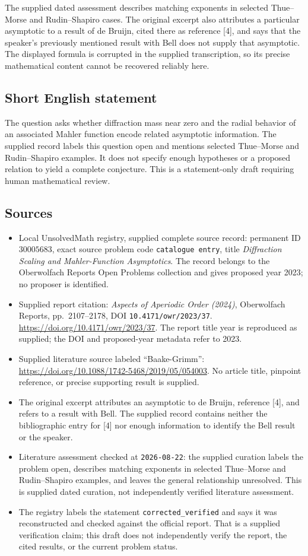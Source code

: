 \documentclass[11pt]{article}
\begin{document}
The supplied dated assessment describes matching exponents in selected Thue--Morse and Rudin--Shapiro cases. The original excerpt also attributes a particular asymptotic to a result of de Bruijn, cited there as reference [4], and says that the speaker's previously mentioned result with Bell does not supply that asymptotic. The displayed formula is corrupted in the supplied transcription, so its precise mathematical content cannot be recovered reliably here.
\subsection{Short English statement}
The question asks whether diffraction mass near zero and the radial behavior of an associated Mahler function encode related asymptotic information. The supplied record labels this question open and mentions selected Thue--Morse and Rudin--Shapiro examples. It does not specify enough hypotheses or a proposed relation to yield a complete conjecture. This is a statement-only draft requiring human mathematical review.
\subsection{Sources}
\begin{itemize}
\item Local UnsolvedMath registry, supplied complete source record: permanent ID \(30005683\), exact source problem code \texttt{catalogue entry}, title \emph{Diffraction Scaling and Mahler-Function Asymptotics}. The record belongs to the Oberwolfach Reports Open Problems collection and gives proposed year 2023; no proposer is identified.
\item Supplied report citation: \emph{Aspects of Aperiodic Order (2024)}, Oberwolfach Reports, pp.\ 2107--2178, DOI \texttt{10.4171/owr/2023/37}. \url{https://doi.org/10.4171/owr/2023/37}. The report title year is reproduced as supplied; the DOI and proposed-year metadata refer to 2023.
\item Supplied literature source labeled ``Baake-Grimm'': \url{https://doi.org/10.1088/1742-5468/2019/05/054003}. No article title, pinpoint reference, or precise supporting result is supplied.
\item The original excerpt attributes an asymptotic to de Bruijn, reference [4], and refers to a result with Bell. The supplied record contains neither the bibliographic entry for [4] nor enough information to identify the Bell result or the speaker.
\item Literature assessment checked at \texttt{2026-08-22}: the supplied curation labels the problem open, describes matching exponents in selected Thue--Morse and Rudin--Shapiro examples, and leaves the general relationship unresolved. This is supplied dated curation, not independently verified literature assessment.
\item The registry labels the statement \texttt{corrected\_verified} and says it was reconstructed and checked against the official report. That is a supplied verification claim; this draft does not independently verify the report, the cited results, or the current problem status.
\end{itemize}
\end{document}

